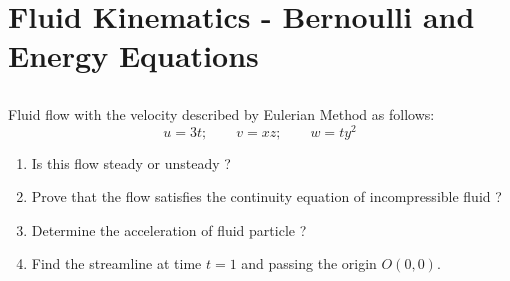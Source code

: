 \chapter{Fluid Kinematics - Bernoulli and Energy Equations}
\section{}
Fluid flow with the velocity described by Eulerian Method as follows:
\[u=3t;\qquad v =xz; \qquad w= ty^2\]
\begin{enumerate}
	\item Is this flow steady or unsteady ?
	\item Prove that the flow satisfies the continuity equation of incompressible fluid ?
	\item Determine the acceleration of fluid particle ?
	\item Find the streamline at time $ t = 1 $ and passing the origin $ O(0,0) $.
\end{enumerate}
